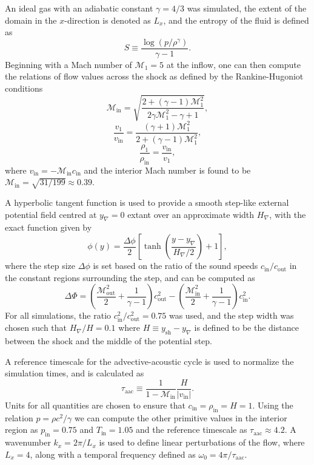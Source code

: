 An ideal gas with an adiabatic constant $\gamma=4/3$ was simulated, the extent of the domain in the $x$-direction is denoted as $L_x$, and the entropy of the fluid is defined as
\begin{equation}
S\equiv\frac{\log\left(p/\rho^\gamma\right)}{\gamma-1}.
\end{equation}
Beginning with a Mach number of $\mathcal{M}_1=5$ at the inflow, one can then compute the relations of flow values across the shock as defined by the Rankine-Hugoniot conditions
\begin{equation}
\mathcal{M}_\textrm{in}=\sqrt{\frac{2+(\gamma-1)\mathcal{M}_1^2}{2\gamma\mathcal{M}_1^2-\gamma+1}},
\end{equation}
\begin{equation}
\frac{v_1}{v_\textrm{in}}=\frac{(\gamma+1)\mathcal{M}_1^2}{2+(\gamma-1)\mathcal{M}_1^2},
\end{equation}
\begin{equation}
\frac{\rho_1}{\rho_\textrm{in}}=\frac{v_\textrm{in}}{v_1},
\end{equation}
where $v_\textrm{in}=-\mathcal{M}_\textrm{in}c_\textrm{in}$ and the interior Mach number is found to be $\mathcal{M}_\textrm{in}=\sqrt{31/199}\approx0.39$.

A hyperbolic tangent function is used to provide a smooth step-like external potential field centred at $y_\nabla=0$ extant over an approximate width $H_\nabla$, with the exact function given by
\begin{equation}
\phi(y)=\frac{\Delta\phi}{2}\left[\tanh\left(\frac{y-y_{\nabla}}{H_{\nabla}/2}\right)+1\right],
\end{equation}
where the step size $\Delta\phi$ is set based on the ratio of the sound speeds $c_{\textrm{in}}/c_{\textrm{out}}$ in the constant regions surrounding the step, and can be computed as
\begin{equation}
\Delta\Phi=\left(\frac{\mathcal{M}_\textrm{out}^2}{2}+\frac{1}{\gamma-1}\right)c_\textrm{out}^2-\left(\frac{\mathcal{M}_\textrm{in}^2}{2}+\frac{1}{\gamma-1}\right)c_\textrm{in}^2.
\end{equation}
For all simulations, the ratio $c_\textrm{in}^2/c_\textrm{out}^2=0.75$ was used, and the step width was chosen such that $H_\nabla/H=0.1$ where $H\equiv y_\textrm{sh}-y_\nabla$ is defined to be the distance between the shock and the middle of the potential step.

A reference timescale for the advective-acoustic cycle is used to normalize the simulation times, and is calculated as
\begin{equation}
\tau_\textrm{aac}\equiv\frac{1}{1-\mathcal{M}_\textrm{in}}\frac{H}{|v_\textrm{in}|}.
\end{equation}
Units for all quantities are chosen to ensure that $c_\textrm{in}=\rho_\textrm{in}=H=1$. Using the relation $p=\rho c^2/\gamma$ we can compute the other primitive values in the interior region as $p_\textrm{in}=0.75$ and $T_\textrm{in}=1.05$ and the reference timescale as $\tau_\textrm{aac}\approx4.2$. A wavenumber $k_x=2\pi/L_x$ is used to define linear perturbations of the flow, where $L_x=4$, along with a temporal frequency defined as $\omega_0=4\pi/\tau_\textrm{aac}$.

